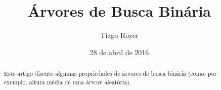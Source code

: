 \documentclass{article}
\theoremstyle{definition}
\theoremstyle{remark}
\begin{document}
\title{Árvores de Busca Binária}
\author{Tiago Royer}
\date{28 de abril de 2016}
\maketitle

\begin{abstract}
    Este artigo discute algumas propriedades de árvores de busca binária
    (como, por exemplo, altura média de uma árvore aleatória).
\end{abstract}






\end{document}
